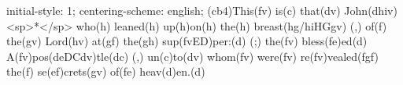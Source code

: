 initial-style: 1;
centering-scheme: english;
(cb4)This(fv) is(c) that(dv) John(dhiv) <sp>*</sp> who(h) leaned(h) up(h)on(h) the(h) breast(hg/hiHGgv) (,) of(f) the(gv) Lord(hv) at(gf) the(gh) sup(fvED)per:(d) (;) the(fv) bless(fe)ed(d) A(fv)pos(deDCdv)tle(dc) (,) un(c)to(dv) whom(fv) were(fv) re(fv)vealed(fgf) the(f) se(ef)crets(gv) of(fe) heav(d)en.(d)
